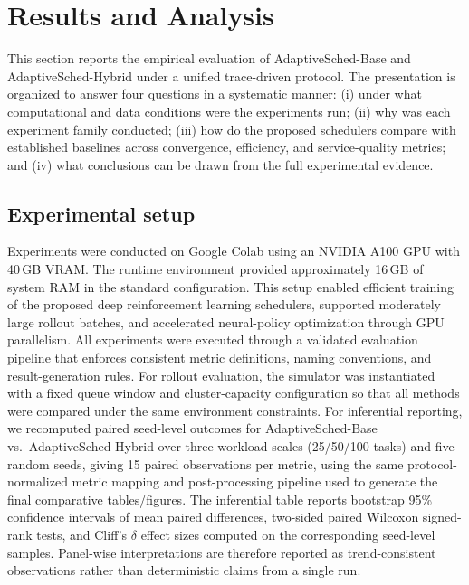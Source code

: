 \documentclass[journal]{IEEEtran}
\begin{document}
\section{\textbf{Results and Analysis}} \label{Sec4}
This section reports the empirical evaluation of AdaptiveSched-Base and AdaptiveSched-Hybrid under a unified trace-driven protocol. The presentation is organized to answer four questions in a systematic manner: (i) under what computational and data conditions were the experiments run; (ii) why was each experiment family conducted; (iii) how do the proposed schedulers compare with established baselines across convergence, efficiency, and service-quality metrics; and (iv) what conclusions can be drawn from the full experimental evidence.

\subsection{Experimental setup}
Experiments were conducted on Google Colab using an NVIDIA A100 GPU with 40\,GB VRAM. The runtime environment provided approximately 16\,GB of system RAM in the standard configuration. This setup enabled efficient training of the proposed deep reinforcement learning schedulers, supported moderately large rollout batches, and accelerated neural-policy optimization through GPU parallelism. All experiments were executed through a validated evaluation pipeline that enforces consistent metric definitions, naming conventions, and result-generation rules. For rollout evaluation, the simulator was instantiated with a fixed queue window and cluster-capacity configuration so that all methods were compared under the same environment constraints. For inferential reporting, we recomputed paired seed-level outcomes for AdaptiveSched-Base vs.\ AdaptiveSched-Hybrid over three workload scales (25/50/100 tasks) and five random seeds, giving 15 paired observations per metric, using the same protocol-normalized metric mapping and post-processing pipeline used to generate the final comparative tables/figures. The inferential table reports bootstrap 95\% confidence intervals of mean paired differences, two-sided paired Wilcoxon signed-rank tests, and Cliff's $\delta$ effect sizes computed on the corresponding seed-level samples. Panel-wise interpretations are therefore reported as trend-consistent observations rather than deterministic claims from a single run.
\end{document}
